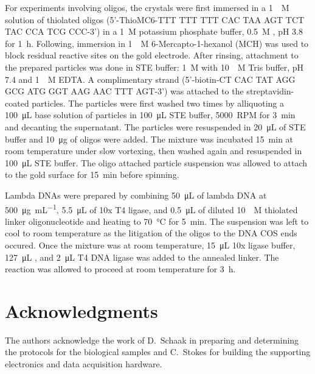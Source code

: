 \documentclass[floatfix,superscriptaddress,a4paper,twocolumn]{revtex4-1}
\begin{document}
For experiments involving oligos, the crystals were first immersed in a
\SI{1}{\micro\textsc{M}} solution of thiolated oligos (5'-ThioMC6-TTT TTT
TTT CAC TAA AGT TCT TAC CCA TCG CCC-3') in a \SI{1}{\textsc{M}} potassium
phosphate buffer, \SI{0.5}{\textsc{M}} , pH 3.8 for
\SI{1}{\hour}.  Following, immersion in \SI{1}{\milli\textsc{M}}
6-Mercapto-1-hexanol (MCH) was used to block residual reactive sites on the
gold electrode.  After rinsing, attachment to the prepared particles was
done in STE buffer: \SI{1}{\textsc{M}}  with
\SI{10}{\milli\textsc{M}} Tris buffer, pH 7.4 and \SI{1}{\milli\textsc{M}}
EDTA\@.  A complimentary strand (5'-biotin-CT CAC TAT AGG GCG ATG GGT AAG
AAC TTT AGT-3') was attached to the streptavidin-coated particles.  The
particles were first washed two times by alliquoting a
\SI{100}{\micro\liter} base solution of particles in \SI{100}{\micro\liter}
STE buffer, \SI{5000}{RPM} for \SI{3}{\minute} and decanting the
supernatant.  The particles were resuspended in \SI{20}{\micro\liter} of
STE buffer and \SI{10}{\micro\gram} of oligos were added.  The mixture was
incubated \SI{15}{\minute} at room temperature under slow vortexing, then
washed again and resuspended in \SI{100}{\micro\liter} STE buffer.  The
oligo attached particle suspension was allowed to attach to the gold
surface for \SI{15}{\minute} before spinning.

Lambda DNAs were prepared by combining \SI{50}{\micro\liter} of lambda DNA
at \SI{500}{\micro\gram\per\milli\liter}, \SI{5.5}{\micro\liter} of 10x T4
ligase, and \SI{0.5}{\micro\liter} of diluted \SI{10}{\micro\textsc{M}}
thiolated linker oligonucleotide and heating to \SI{70}{\celsius} for
\SI{5}{\minute}.  The suspension was left to cool to room temperature as
the litigation of the oligos to the DNA COS ends occured. Once the mixture
was at room temperature, \SI{15}{\micro\liter} 10x ligase buffer,
\SI{127}{\micro\liter} , and \SI{2}{\micro\liter} T4 DNA ligase was
added to the annealed linker.  The reaction was allowed to proceed at room
temperature for \SI{3}{\hour}.

\section*{Acknowledgments}
\label{sec:acknowledgements}
The authors acknowledge the work of D\@.~Schaak in preparing and determining
the protocols for the biological samples and C\@.~Stokes for building the
supporting electronics and data acquisition hardware.
\end{document}
